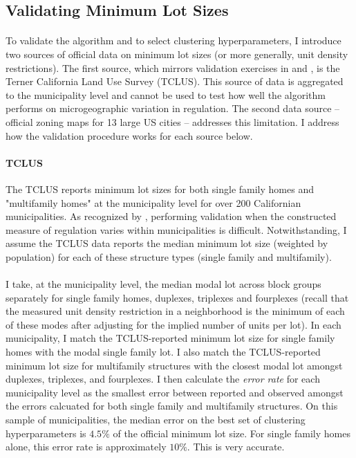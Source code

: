 \documentclass[12pt]{article}
\begin{document}
	\clearpage
	\subsection{Validating Minimum Lot Sizes}\label{Appendix:ValidateStringency}
	\paragraph*{}
	To validate the algorithm and to select clustering hyperparameters, I introduce two sources of official data on minimum lot sizes (or more generally, unit density restrictions). The first source, which mirrors validation exercises in \cite{Song} and \cite{Cui}, is the Terner California Land Use Survey (TCLUS). This source of data is aggregated to the municipality level and cannot be used to test how well the algorithm performs on microgeographic variation in regulation. The second data source -- official zoning maps for 13 large US cities -- addresses this limitation. I address how the validation procedure works for each source below. 
	
	\paragraph*{TCLUS} The TCLUS reports minimum lot sizes for both single family homes and "multifamily homes" at the municipality level for over 200 Californian municipalities. As recognized by \cite{Song}, performing validation when the constructed measure of regulation varies within municipalities is difficult. Notwithstanding, I assume the TCLUS data reports the median minimum lot size (weighted by population) for each of these structure types (single family and multifamily). 
	\paragraph*{}
	I take, at the municipality level, the median modal lot across block groups separately for single family homes, duplexes, triplexes and fourplexes (recall that the measured unit density restriction in a neighborhood is the minimum of each of these modes after adjusting for the implied number of units per lot). In each municipality, I match the TCLUS-reported minimum lot size for single family homes with the modal single family lot. I also match the TCLUS-reported minimum lot size for multifamily structures with the closest modal lot amongst duplexes, triplexes, and fourplexes. I then calculate the \textit{error rate} for each municipality level as the smallest error between reported and observed amongst the errors calcuated for both single family and multifamily structures. On this sample of municipalities, the median error on the best set of clustering hyperparameters is $4.5\%$ of the official minimum lot size. For single family homes alone, this error rate is approximately $10\%$. This is very accurate. 
	
\end{document}
